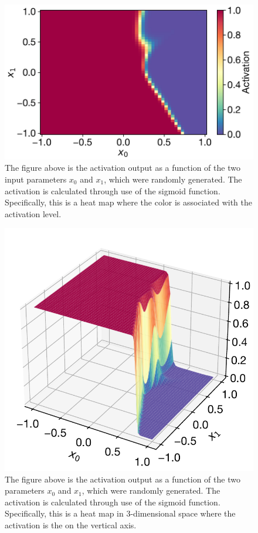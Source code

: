\begin{figure}[H]
\centering
\includegraphics[scale=0.65]{../figures/output_activation.pdf}
\caption{The figure above is the activation output as a function of the two input parameters $x_0$ and $x_1$, which were randomly generated. The activation is calculated through use of the sigmoid function. Specifically, this is a heat map where the color is associated with the activation level.}
\end{figure}

\begin{figure}[H]
\centering
\includegraphics[scale=0.65]{../figures/3D_activation.pdf}
\caption{The figure above is the activation output as a function of the two parameters $x_0$ and $x_1$, which were randomly generated. The activation is calculated through use of the sigmoid function. Specifically, this is a heat map in 3-dimensional space where the activation is the on the vertical axis.}
\end{figure}

